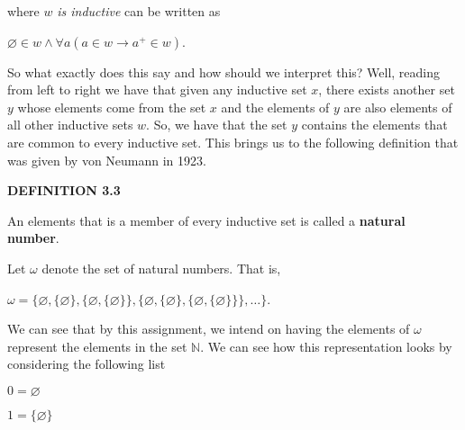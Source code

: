 \documentclass[12pt, a4paper]{article}
\begin{document}
\noindent where $w$\textit{ is inductive} can be written as\par

\vspace{4mm}

\centerline{$\varnothing\in w\wedge\forall a(a\in w\rightarrow a^+\in w)$.}

\vspace{4mm}

\noindent So what exactly does this say and how should we interpret this? Well, reading from left to right we have that given any inductive set $x$, there exists another set $y$ whose elements come from the set $x$ and the elements of $y$ are also elements of all other inductive sets $w$. So, we have that the set $y$ contains the elements that are common to every inductive set. This brings us to the following definition that was given by von Neumann in 1923.

\vspace{4mm}

\noindent\blacksquare\textbf{ DEFINITION 3.3}\par

\vspace{4mm}

An elements that is a member of every inductive set is called a \textbf{natural number}.\par Let $\omega$ denote the set of natural numbers. That is,\par

\vspace{4mm}

\centerline{$\omega=\{\varnothing,\{\varnothing\},\{\varnothing,\{\varnothing\}\},\{\varnothing,\{\varnothing\},\{\varnothing,\{\varnothing\}\}\} ,\ldots\}$.}

\vspace{4mm}

\noindent We can see that by this assignment, we intend on having the elements of $\omega$ represent the elements in the set $\mathbb{N}$. We can see how this representation looks by considering the following list\par

\vspace{4mm}

\hspace{25mm}$0=\varnothing$

\vspace{2mm}

\hspace{25mm}$1=\{\varnothing\}$
\end{document}
